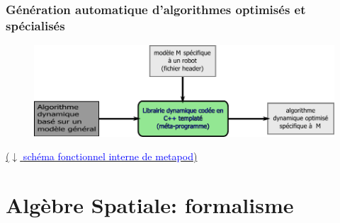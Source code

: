 \documentclass[10pt]{beamer}
\begin{document}
\begin{frame}
  \frametitle{Génération automatique d'algorithmes optimisés et spécialisés}
  
	\begin{figure}[H]
	\begin{center}
	\includegraphics[width=\textwidth]{figs/principeAlgoGenerique.pdf}
	\label{fig_generationAlgoAutomatique}
	\end{center}
	\end{figure}
  
	
	\bigskip
	\href{run:/home/nuno/Documents/Stage/Soutenance/figs/archiMetapod.pdf}
	{($\downarrow$ \textcolor{blue}{schéma fonctionnel interne de metapod})}

\end{frame}


\section{Algèbre Spatiale: formalisme}

\end{document}
